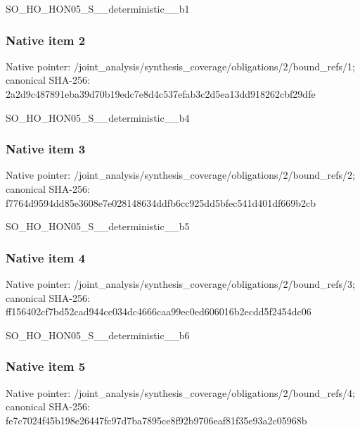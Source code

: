 \documentclass[10pt,a4paper]{article}
\begin{document}
\begingroup\raggedright\sloppy SO\_\allowbreak{}HO\_\allowbreak{}HON05\_\allowbreak{}S\_\allowbreak{}\_\allowbreak{}deterministic\_\allowbreak{}\_\allowbreak{}b1\par\endgroup

\subsubsection{Native item 2}
Native pointer: /joint\_\allowbreak{}analysis/synthesis\_\allowbreak{}coverage/obligations/2/bound\_\allowbreak{}refs/1; canonical SHA-256: 2a2d9c487891eba39d70b19edc7e8d4c537efab3c2d5ea13dd918262cbf29dfe

\begingroup\raggedright\sloppy SO\_\allowbreak{}HO\_\allowbreak{}HON05\_\allowbreak{}S\_\allowbreak{}\_\allowbreak{}deterministic\_\allowbreak{}\_\allowbreak{}b4\par\endgroup

\subsubsection{Native item 3}
Native pointer: /joint\_\allowbreak{}analysis/synthesis\_\allowbreak{}coverage/obligations/2/bound\_\allowbreak{}refs/2; canonical SHA-256: f7764d9594dd85e3608e7e028148634ddfb6cc925dd5bfec541d401df669b2cb

\begingroup\raggedright\sloppy SO\_\allowbreak{}HO\_\allowbreak{}HON05\_\allowbreak{}S\_\allowbreak{}\_\allowbreak{}deterministic\_\allowbreak{}\_\allowbreak{}b5\par\endgroup

\subsubsection{Native item 4}
Native pointer: /joint\_\allowbreak{}analysis/synthesis\_\allowbreak{}coverage/obligations/2/bound\_\allowbreak{}refs/3; canonical SHA-256: ff156402cf7bd52cad944cc034dc4666caa99ec0ed606016b2ecdd5f2454dc06

\begingroup\raggedright\sloppy SO\_\allowbreak{}HO\_\allowbreak{}HON05\_\allowbreak{}S\_\allowbreak{}\_\allowbreak{}deterministic\_\allowbreak{}\_\allowbreak{}b6\par\endgroup

\subsubsection{Native item 5}
Native pointer: /joint\_\allowbreak{}analysis/synthesis\_\allowbreak{}coverage/obligations/2/bound\_\allowbreak{}refs/4; canonical SHA-256: fe7c7024f45b198e26447fc97d7ba7895ce8f92b9706eaf81f35e93a2c05968b
\end{document}
